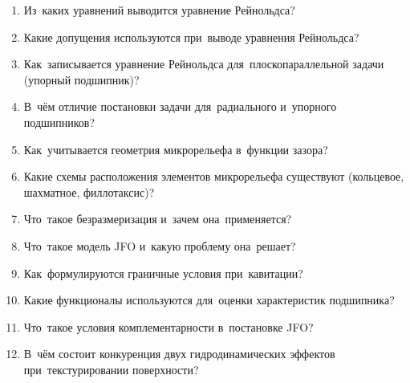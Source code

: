 \begin{enumerate}
\item Из~каких уравнений выводится уравнение Рейнольдса?
\item Какие допущения используются при~выводе уравнения Рейнольдса?
\item Как~записывается уравнение Рейнольдса для~плоскопараллельной задачи (упорный подшипник)?
\item В~чём отличие постановки задачи для~радиального и~упорного подшипников?
\item Как~учитывается геометрия микрорельефа в~функции зазора?
\item Какие схемы расположения элементов микрорельефа существуют (кольцевое, шахматное, филлотаксис)?
\item Что~такое безразмеризация и~зачем она~применяется?
\item Что~такое модель JFO и~какую проблему она~решает?
\item Как~формулируются граничные условия при~кавитации?
\item Какие функционалы используются для~оценки характеристик подшипника?
\item Что~такое условия комплементарности в~постановке JFO?
\item В~чём состоит конкуренция двух гидродинамических эффектов при~текстурировании поверхности?
\end{enumerate}

